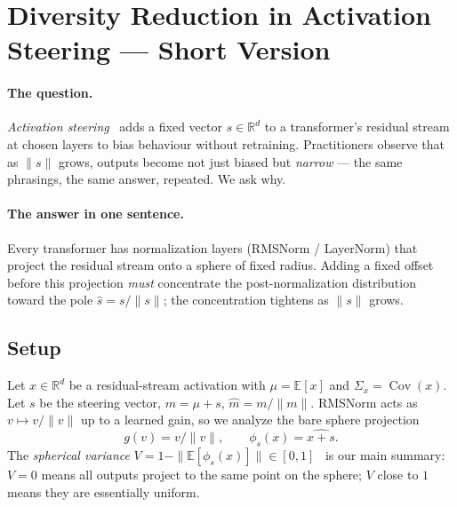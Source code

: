 %
%
%
%


\section{Diversity Reduction in Activation Steering --- Short Version}
\label{sec:abridged}

\paragraph{The question.}
\emph{Activation steering}~\citep{turntrout2023steering} adds a fixed
vector $s \in \mathbb{R}^d$ to a transformer's residual stream at chosen
layers to bias behaviour without retraining. Practitioners observe that
as $\|s\|$ grows, outputs become not just biased but \emph{narrow} --- the
same phrasings, the same answer, repeated. We ask why.

\paragraph{The answer in one sentence.}
Every transformer has normalization layers (RMSNorm / LayerNorm) that project
the residual stream onto a sphere of fixed radius. Adding a fixed offset
before this projection \emph{must} concentrate the post-normalization
distribution toward the pole $\hat{s} = s/\|s\|$; the concentration
tightens as $\|s\|$ grows.

\subsection{Setup}

Let $x \in \mathbb{R}^d$ be a residual-stream activation with
$\mu = \mathbb{E}[x]$ and $\Sigma_x = \operatorname{Cov}(x)$. Let $s$ be
the steering vector, $m = \mu + s$, $\hat{m} = m / \|m\|$. RMSNorm acts as
$v \mapsto v / \|v\|$ up to a learned gain, so we analyze the bare
sphere projection
\[
  g(v) = v / \|v\|, \qquad
  \phi_s(x) = \widehat{x + s}.
\]
The \emph{spherical variance}
$V = 1 - \|\mathbb{E}[\phi_s(x)]\| \in [0,1]$~\citep{mardia2000directional}
is our main summary: $V = 0$ means all outputs project to the same point on
the sphere; $V$ close to $1$ means they are essentially uniform.

